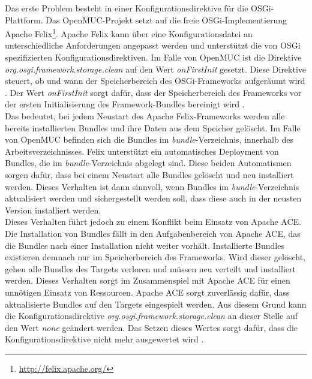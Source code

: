 Das erste Problem besteht in einer Konfigurationsdirektive für die \ac{OSGi}-Plattform. 
Das OpenMUC-Projekt setzt auf die freie \ac{OSGi}-Implementierung Apache Felix\footnote{\url{http://felix.apache.org/}}.
Apache Felix kann über eine Konfigurationsdatei an unterschiedliche Anforderungen angepasst werden und unterstützt die von \ac{OSGi} spezifizierten Konfigurationsdirektiven.
Im Falle von OpenMUC ist die Direktive \textit{org.osgi.framework.storage.clean} auf den Wert \textit{onFirstInit} gesetzt.
Diese Direktive steuert, ob und wann der Speicherbereich des \ac{OSGi}-Frameworks aufgeräumt wird \cite[S. 99]{osgi_r6}.
Der Wert \textit{onFirstInit} sorgt dafür, dass der Speicherbereich des Frameworks vor der ersten Initialisierung des Framework-Bundles bereinigt wird \cite[S. 99]{osgi_r6}.\\

Das bedeutet, bei jedem Neustart des Apache Felix-Frameworks werden alle bereits installierten Bundles und ihre Daten aus dem Speicher gelöscht.
Im Falle von OpenMUC befinden sich die Bundles im \textit{bundle}-Verzeichnis, innerhalb des Arbeitsverzeichnisses.
Felix unterstützt ein automatisches Deployment von Bundles, die im \textit{bundle}-Verzeichnis abgelegt sind.
Diese beiden Automatismen sorgen dafür, dass bei einem Neustart alle Bundles gelöscht und neu installiert werden. 
Dieses Verhalten ist dann sinnvoll, wenn Bundles im \textit{bundle}-Verzeichnis aktualisiert werden und sichergestellt werden soll,
dass diese auch in der neusten Version installiert werden.\\

Dieses Verhalten führt jedoch zu einem Konflikt beim Einsatz von Apache ACE.
Die Installation von Bundles fällt in den Aufgabenbereich von Apache ACE, das die Bundles nach einer Installation nicht weiter vorhält.
Installierte Bundles existieren demnach nur im Speicherbereich des Frameworks. 
Wird dieser gelöscht, gehen alle Bundles des Targets verloren und müssen neu verteilt und installiert werden.
Dieses Verhalten sorgt im Zusammenspiel mit Apache ACE für einen unnötigen Einsatz von Ressourcen. 
Apache ACE sorgt zuverlässig dafür, dass aktualisierte Bundles auf den Targets eingespielt werden. Aus diesem Grund kann die 
Konfigurationsdirektive \textit{org.osgi.framework.storage.clean} an dieser Stelle auf den Wert \textit{none} geändert werden.
Das Setzen dieses Wertes sorgt dafür, dass die Konfigurationsdirektive nicht mehr ausgewertet wird \cite[S. 99]{osgi_r6}.\\

